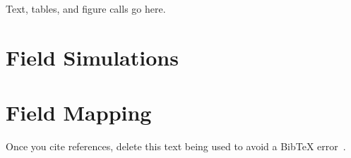  
 
Text, tables, and figure calls go here.
 
\section{Field Simulations}
\label{Field_Simulations}
 
 
 
\section{Field Mapping}
\label{Field_Mapping}


Once you cite references, delete this text being used
to avoid a BibTeX error~\cite{Adare:2010ux}.
